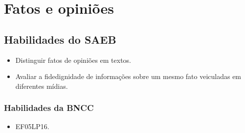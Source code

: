 \chapter{Fatos e opiniões}

\section*{Habilidades do SAEB}

\begin{itemize}
\item Distinguir fatos de opiniões em textos.

\item Avaliar a fidedignidade de informações sobre um mesmo fato veiculadas
em diferentes mídias.
\end{itemize}

\subsection{Habilidades da BNCC}

\begin{itemize}
\item EF05LP16.
\end{itemize}



